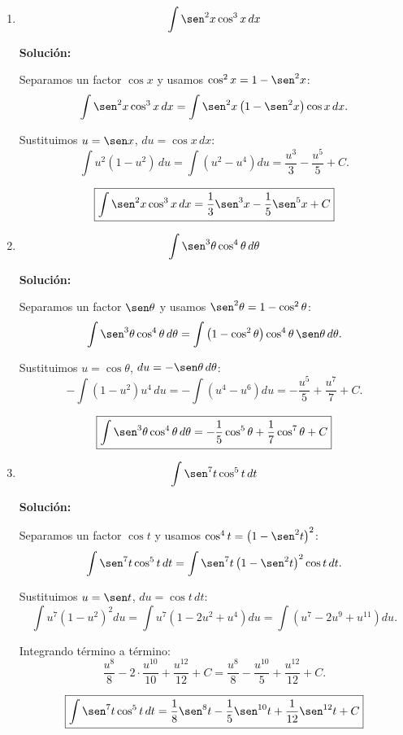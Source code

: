 \documentclass[12pt]{article}
\newcommand{\solucion}{%
    \vspace{0.8em}%
    \textbf{Solución:}%
}
\begin{document}
\begin{enumerate}[label=\alph*.-]

    \item
    \[
    \int\sen^2x\cos^3x\,dx
    \]

    \solucion

    Separamos un factor $\cos x$ y usamos $\cos^2x=1-\sen^2x$:
    \[
    \int\sen^2x\cos^3x\,dx=\int\sen^2x\left(1-\sen^2x\right)\cos x\,dx.
    \]

    Sustituimos $u=\sen x$, $du=\cos x\,dx$:
    \[
    \int u^2(1-u^2)\,du=\int\left(u^2-u^4\right)du=\frac{u^3}{3}-\frac{u^5}{5}+C.
    \]

    \[
    \boxed{
    \int\sen^2x\cos^3x\,dx=\frac13\sen^3x-\frac15\sen^5x+C
    }
    \]


    \item
    \[
    \int\sen^3\theta\cos^4\theta\,d\theta
    \]

    \solucion

    Separamos un factor $\sen\theta$ y usamos $\sen^2\theta=1-\cos^2\theta$:
    \[
    \int\sen^3\theta\cos^4\theta\,d\theta
    =\int\left(1-\cos^2\theta\right)\cos^4\theta\,\sen\theta\,d\theta.
    \]

    Sustituimos $u=\cos\theta$, $du=-\sen\theta\,d\theta$:
    \[
    -\int\left(1-u^2\right)u^4\,du=-\int\left(u^4-u^6\right)du
    =-\frac{u^5}{5}+\frac{u^7}{7}+C.
    \]

    \[
    \boxed{
    \int\sen^3\theta\cos^4\theta\,d\theta=-\frac15\cos^5\theta+\frac17\cos^7\theta+C
    }
    \]


    \item
    \[
    \int\sen^7t\cos^5t\,dt
    \]

    \solucion

    Separamos un factor $\cos t$ y usamos $\cos^4t=\left(1-\sen^2t\right)^2$:
    \[
    \int\sen^7t\cos^5t\,dt
    =\int\sen^7t\left(1-\sen^2t\right)^2\cos t\,dt.
    \]

    Sustituimos $u=\sen t$, $du=\cos t\,dt$:
    \[
    \int u^7\left(1-u^2\right)^2du
    =\int u^7\left(1-2u^2+u^4\right)du
    =\int\left(u^7-2u^9+u^{11}\right)du.
    \]

    Integrando término a término:
    \[
    \frac{u^8}{8}-2\cdot\frac{u^{10}}{10}+\frac{u^{12}}{12}+C
    =\frac{u^8}{8}-\frac{u^{10}}{5}+\frac{u^{12}}{12}+C.
    \]

    \[
    \boxed{
    \int\sen^7t\cos^5t\,dt=\frac18\sen^8t-\frac15\sen^{10}t+\frac{1}{12}\sen^{12}t+C
    }
    \]



\end{enumerate}
\end{document}
